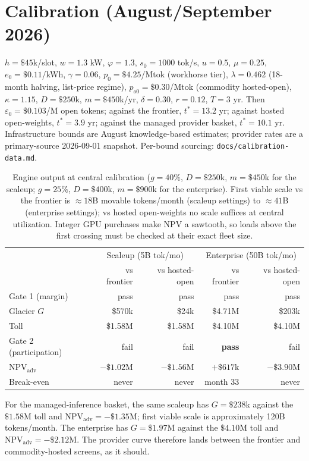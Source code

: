\documentclass[11pt]{article}
\begin{document}
\section{Calibration (August/September 2026)}
$h=\$45$k/slot, $w=1.3$ kW, $\varphi=1.3$, $s_0=1000$ tok/s, $u=0.5$, $\mu=0.25$,
$e_0=\$0.11$/kWh, $\gamma=0.06$, $p_0=\$4.25$/Mtok (workhorse tier), $\lambda=0.462$
(18-month halving, list-price regime), $p_{o0}=\$0.30$/Mtok (commodity hosted-open),
$\kappa=1.15$, $D=\$250$k, $m=\$450$k/yr, $\delta=0.30$, $r=0.12$,
$T=3$ yr. Then $\varepsilon_0=\$0.103$/M open tokens; against the frontier,
$t^\ast=13.2$ yr; against hosted open-weights, $t^\ast=3.9$ yr; against the managed
provider basket, $t^\ast=10.1$ yr. Infrastructure bounds are August knowledge-based
estimates; provider rates are a primary-source 2026-09-01 snapshot. Per-bound sourcing:
\texttt{docs/calibration-data.md}.

\begin{table}[h]\centering\small
\begin{tabular}{lrrrr}
\toprule
 & \multicolumn{2}{c}{Scaleup (5B tok/mo)} & \multicolumn{2}{c}{Enterprise (50B tok/mo)}\\
 & vs frontier & vs hosted-open & vs frontier & vs hosted-open\\
\midrule
Gate 1 (margin) & pass & pass & pass & pass\\
Glacier $G$ & \$570k & \$24k & \$4.71M & \$203k\\
Toll & \$1.58M & \$1.58M & \$4.10M & \$4.10M\\
Gate 2 (participation) & fail & fail & \textbf{pass} & fail\\
$\mathrm{NPV_{adv}}$ & $-\$1.02$M & $-\$1.56$M & $+\$617$k & $-\$3.90$M\\
Break-even & never & never & month 33 & never\\
\bottomrule
\end{tabular}
\caption{Engine output at central calibration ($g=40\%$, $D=\$250$k, $m=\$450$k for the
scaleup; $g=25\%$, $D=\$400$k, $m=\$900$k for the enterprise). First viable scale vs the
frontier is $\approx18$B movable tokens/month (scaleup settings) to $\approx41$B
(enterprise settings); vs hosted open-weights no scale suffices at central utilization.
Integer GPU purchases make NPV a sawtooth, so loads above the first crossing must be checked
at their exact fleet size.}
\end{table}

For the managed-inference basket, the same scaleup has $G=\$238$k against the $\$1.58$M
toll and $\mathrm{NPV_{adv}}=-\$1.35$M; first viable scale is approximately 120B
tokens/month. The enterprise has $G=\$1.97$M against the $\$4.10$M toll and
$\mathrm{NPV_{adv}}=-\$2.12$M. The provider curve therefore lands between the frontier
and commodity-hosted screens, as it should.
\end{document}
